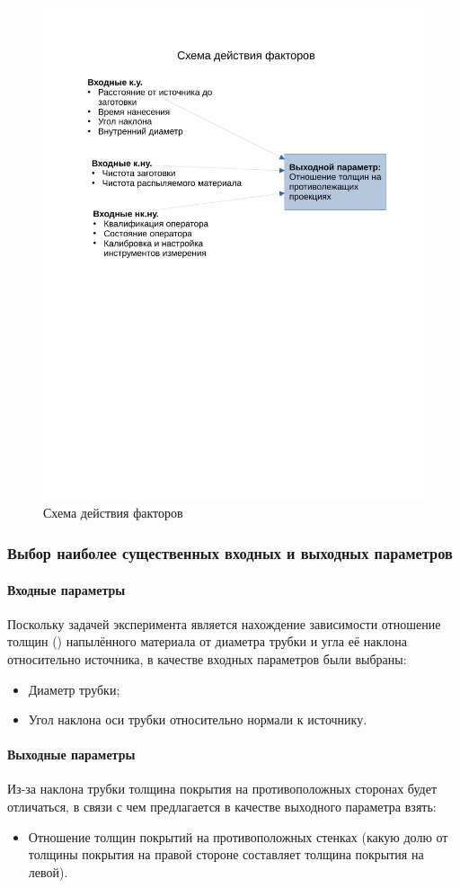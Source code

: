 \documentclass[../../AISTR.tex]{subfiles}
\begin{document}
\begin{figure}[H]
	\centering
	\includegraphics[trim=60 370 60 110,clip,width=0.8\linewidth]{scheme}
	\caption{Схема действия факторов}
	\label{fig:sheme}
\end{figure}


\subsubsection{Выбор наиболее существенных входных и выходных параметров}
\paragraph{Входные параметры}\label{par:vhod}
Поскольку задачей эксперимента является нахождение зависимости отношение толщин () напылённого материала от диаметра трубки и угла её наклона относительно источника, в качестве входных параметров были выбраны:
\begin{itemize}
	\item Диаметр трубки;
	\item Угол наклона оси трубки относительно нормали к источнику.
\end{itemize}
\paragraph{Выходные параметры}\label{par:vihod}
Из-за наклона трубки толщина покрытия на противоположных сторонах будет отличаться, в связи с чем предлагается в качестве выходного параметра взять:
\begin{itemize}
	\item Отношение толщин покрытий на противоположных стенках (какую долю от толщины покрытия на правой стороне составляет толщина покрытия на левой).
\end{itemize}
\end{document}
